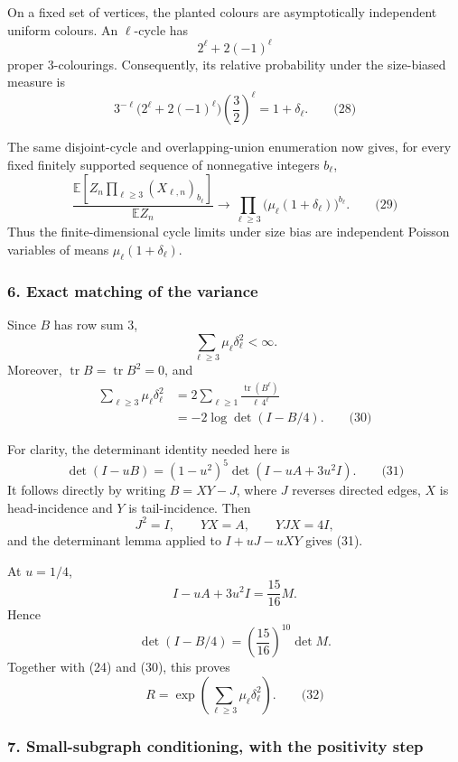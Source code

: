 \documentclass[
  11pt,
  a4paper,
]{article}
\begin{document}
On a fixed set of vertices, the planted colours are asymptotically
independent uniform colours. An \(\ell\)-cycle has \[
2^\ell+2(-1)^\ell
\] proper 3-colourings. Consequently, its relative probability under the
size-biased measure is \[
3^{-\ell}\bigl(2^\ell+2(-1)^\ell\bigr)
          \left(\frac32\right)^\ell
 =1+\delta_\ell.                                                \qquad\text{(28)}
\]

The same disjoint-cycle and overlapping-union enumeration now gives, for
every fixed finitely supported sequence of nonnegative integers
\(b_\ell\), \[
\frac{
 \mathbb E\!\left[Z_n\prod_{\ell\ge3}(X_{\ell,n})_{b_\ell}\right]}
 {\mathbb E Z_n}
 \longrightarrow
 \prod_{\ell\ge3}
 \bigl(\mu_\ell(1+\delta_\ell)\bigr)^{b_\ell}.                    \qquad\text{(29)}
\] Thus the finite-dimensional cycle limits under size bias are
independent Poisson variables of means \(\mu_\ell(1+\delta_\ell)\).

\subsubsection{6. Exact matching of the
variance}\label{exact-matching-of-the-variance}

Since \(B\) has row sum \(3\), \[
\sum_{\ell\ge3}\mu_\ell\delta_\ell^2<\infty.
\] Moreover, \(\operatorname{tr}B=\operatorname{tr}B^2=0\), and
\begin{equation*}
\begin{split}
\sum_{\ell\ge3}\mu_\ell\delta_\ell^2
 &=2\sum_{\ell\ge1}\frac{\operatorname{tr}(B^\ell)}{\ell\,4^\ell}\\
 &=-2\log\det(I-B/4).                                          \qquad\text{(30)}
\end{split}
\end{equation*}

For clarity, the determinant identity needed here is \[
\det(I-uB)=(1-u^2)^5\det(I-uA+3u^2I).                          \qquad\text{(31)}
\] It follows directly by writing \(B=XY-J\), where \(J\) reverses
directed edges, \(X\) is head-incidence and \(Y\) is tail-incidence.
Then \[
J^2=I,\qquad YX=A,\qquad YJX=4I,
\] and the determinant lemma applied to \(I+uJ-uXY\) gives (31).

At \(u=1/4\), \[
I-uA+3u^2I=\frac{15}{16}M.
\] Hence \[
\det(I-B/4)=\left(\frac{15}{16}\right)^{10}\det M.
\] Together with (24) and (30), this proves \[
R=\exp\left(\sum_{\ell\ge3}\mu_\ell\delta_\ell^2\right).          \qquad\text{(32)}
\]

\subsubsection{7. Small-subgraph conditioning, with the positivity
step}\label{small-subgraph-conditioning-with-the-positivity-step}
\end{document}
